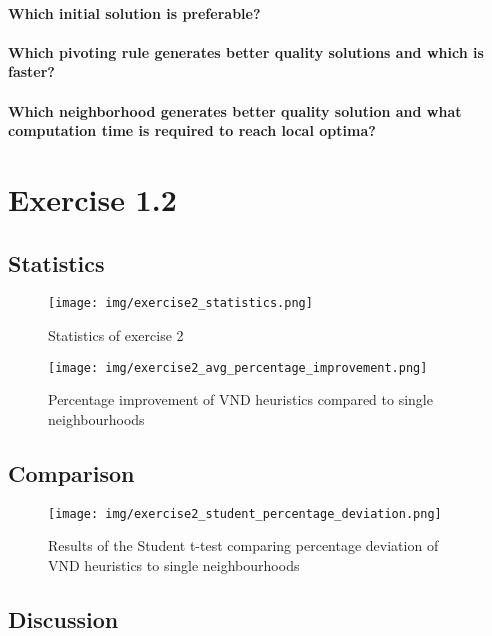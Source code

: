 \documentclass[a4paper,10pt]{article}
\begin{document}
\paragraph{Which initial solution is preferable?}

\paragraph{Which pivoting rule generates better quality solutions and which is faster?}

\paragraph{Which neighborhood generates better quality solution and what computation time is required to reach local optima?}

\section{Exercise 1.2}

\subsection{Statistics}

\begin{figure}[H]
	\centering
	\caption{Statistics of exercise 2}
	\texttt{[image: img/exercise2\_statistics.png]}
\end{figure}


\begin{figure}[H]
	\centering
	\caption{Percentage improvement of VND heuristics compared to single neighbourhoods}
	\texttt{[image: img/exercise2\_avg\_percentage\_improvement.png]}
\end{figure}

\subsection{Comparison}

\begin{figure}[H]
	\centering
	\caption{Results of the Student t-test comparing percentage deviation of VND heuristics to single neighbourhoods}
	\texttt{[image: img/exercise2\_student\_percentage\_deviation.png]}
\end{figure}

\subsection{Discussion}
\end{document}
